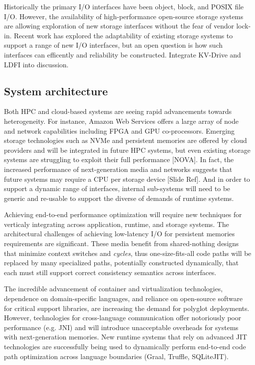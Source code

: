 \documentclass{sig-alternate-05-2015}
\begin{document}
Historically the primary I/O interfaces have been object, block, and POSIX file
I/O. However, the availability of high-performance open-source storage systems
are allowing exploration of new storage interfaces without the fear of vendor
lock-in.  Recent work has explored the adaptability of existing storage systems
to support a range of new I/O interfaces, but an open question is how such
interfaces can efficently and reliability be constructed. Integrate KV-Drive and
LDFI into discussion.

\subsection{System architecture}

Both HPC and cloud-based systems are seeing rapid advancements towards
heterogeneity. For instance, Amazon Web Services offers a large array of node
and network capabilities including FPGA and GPU co-processors. Emerging storage
technologies such as NVMe and persistent memories are offered by cloud providers
and will be integrated in future HPC systems, but even existing storage systems
are struggling to exploit their full performance [NOVA]. In fact, the increased
performance of next-generation media and networks suggests that future systems
may require a CPU per storage device [Slide Ref]. And in order to support a
dynamic range of interfaces, internal sub-systems will need to be generic and
re-usable to support the diverse of demands of runtime systems.

Achieving end-to-end performance optimization will require new techniques for
verticaly integrating across application, runtime, and storage systems. The
architectural challenges of achieving low-latency I/O for persistent memories
requirements are significant. These media benefit from shared-nothing designs
that minimize context switches and \emph{cycles}, thus one-size-fits-all code
paths will be replaced by many specialized paths, potentially constructed
dynamically, that each must still support correct consistency semantics across
interfaces.

The incredible advancement of container and virtualization technologies,
dependence on domain-specific languages, and reliance on open-source software
for critical support libraries, are increasing the demand for polyglot
deployments. However, technologies for cross-language communication offer
notoriously poor performance (e.g. JNI) and will introduce unacceptable
overheads for systems with next-generation memories. New runtime systems that
rely on advanced JIT technologies are successfully being used to dynamically
perform end-to-end code path optimization across language boundaries (Graal,
Truffle, SQLiteJIT).
\end{document}
